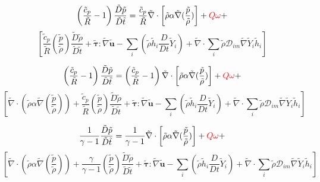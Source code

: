 \documentclass[preprint,12pt,authoryear]{elsarticle}
\begin{document}
{\[
          \left(
          \frac{ \tilde{c}_{p} }{ \tilde{R} }
          -
          1
          \right)
         \frac{\tilde{D}  \tilde{p}} {\tilde{D}\tilde{t} }
		=
		\frac{\tilde{c}_{p}}{\tilde{R}}
		\tilde{\nabla} \cdot 
			\left[ \tilde{\rho} \alpha
		\tilde{\nabla} (\frac{ \tilde{p} }{  \tilde{\rho} } )\right]
                +
        {\color{red} Q\omega}
        +
\]
\[
        \left[
        \frac{ \tilde{c}_{p} }{ \tilde{R} }
        (\frac{ \tilde{p} }{  \tilde{\rho} } )
		 \frac{\tilde{D}\tilde{\rho} } {\tilde{D}\tilde{t}}
		 +
        \pmb{\tilde{\tau}}:\tilde{\nabla} \tilde{\mathbf{u}} 
        -
        \sum\limits_i
        \left(
                 \tilde{\rho}\tilde{h}_i
                \frac{D}{Dt}
		\tilde{Y}_i
		\right)
        +
        \tilde{\nabla} \cdot
        \sum\limits_i 
        \tilde{\rho}\mathcal{D}_{im}\tilde{\nabla}\tilde{Y}_i     
        \tilde{h}_i
        \right]
\]


\[
          \left(
          \frac{ \tilde{c}_{p} }{ \tilde{R} }
          -
          1
          \right)
         \frac{\tilde{D}  \tilde{p}} {\tilde{D}\tilde{t} }
		=
          \left(
          \frac{ \tilde{c}_{p} }{ \tilde{R} }
          -
          1
          \right)
		\tilde{\nabla} \cdot 
			\left[ \tilde{\rho} \alpha
		\tilde{\nabla} (\frac{ \tilde{p} }{  \tilde{\rho} } )\right]
                +
        {\color{red} Q\omega}
        +
\]
\[
        \left[
        \tilde{\nabla} \cdot 
		\left( 
		\tilde{\rho} \alpha
		\tilde{\nabla} (\frac{ \tilde{p} }{  \tilde{\rho} } )
		\right)
        +
        \frac{ \tilde{c}_{p} }{ \tilde{R} }
        (\frac{ \tilde{p} }{  \tilde{\rho} } )
		 \frac{\tilde{D}\tilde{\rho} } {\tilde{D}\tilde{t}}
		 +
        \pmb{\tilde{\tau}}:\tilde{\nabla} \tilde{\mathbf{u}} 
        -
        \sum\limits_i
        \left(
                 \tilde{\rho}\tilde{h}_i
                \frac{D}{Dt}
		\tilde{Y}_i
		\right)
        +
        \tilde{\nabla} \cdot
        \sum\limits_i 
        \tilde{\rho}\mathcal{D}_{im}\tilde{\nabla}\tilde{Y}_i     
        \tilde{h}_i
        \right]
\]

\[
          \frac{ 1 }{ \gamma - 1}
         \frac{\tilde{D}  \tilde{p}} {\tilde{D}\tilde{t} }
		=
        \frac{ 1 }{ \gamma -1 }
		\tilde{\nabla} \cdot 
			\left[ \tilde{\rho} \alpha
		\tilde{\nabla} (\frac{ \tilde{p} }{  \tilde{\rho} } )\right]
                +
        {\color{red} Q\omega}
        +
\]
\[
        \left[
        \tilde{\nabla} \cdot 
		\left( 
		\tilde{\rho} \alpha
		\tilde{\nabla} (\frac{ \tilde{p} }{  \tilde{\rho} } )
		\right)
        +
        \frac{ \gamma }{ \gamma - 1 }
        (\frac{ \tilde{p} }{  \tilde{\rho} } )
		 \frac{\tilde{D}\tilde{\rho} } {\tilde{D}\tilde{t}}
		 +
        \pmb{\tilde{\tau}}:\tilde{\nabla} \tilde{\mathbf{u}} 
        -
        \sum\limits_i
        \left(
                 \tilde{\rho}\tilde{h}_i
                \frac{D}{Dt}
		\tilde{Y}_i
		\right)
        +
        \tilde{\nabla} \cdot
        \sum\limits_i 
        \tilde{\rho}\mathcal{D}_{im}\tilde{\nabla}\tilde{Y}_i     
        \tilde{h}_i
        \right]
\]

}
\end{document}
